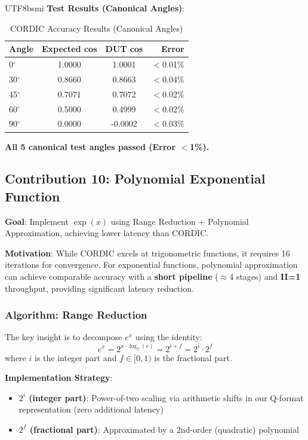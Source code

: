 \documentclass[journal,twoside]{IEEEtran}
\begin{document}
\begin{CJK}{UTF8}{bsmi}
\textbf{Test Results (Canonical Angles)}:
\begin{table}[htbp]
\centering
\caption{CORDIC Accuracy Results (Canonical Angles)}
\footnotesize
\begin{tabular}{@{}lccr@{}}
\toprule
\textbf{Angle} & \textbf{Expected cos} & \textbf{DUT cos} & \textbf{Error} \\
\midrule
0$^\circ$ & 1.0000 & 1.0001 & $<$0.01\% \\
30$^\circ$ & 0.8660 & 0.8663 & $<$0.04\% \\
45$^\circ$ & 0.7071 & 0.7072 & $<$0.02\% \\
60$^\circ$ & 0.5000 & 0.4999 & $<$0.02\% \\
90$^\circ$ & 0.0000 & -0.0002 & $<$0.03\% \\
\bottomrule
\end{tabular}
\end{table}

\textbf{All 5 canonical test angles passed (Error $<$1\%).}

\subsection{Contribution 10: Polynomial Exponential Function}

\textbf{Goal}: Implement $\exp(x)$ using Range Reduction + Polynomial Approximation, achieving lower latency than CORDIC.

\textbf{Motivation}: While CORDIC excels at trigonometric functions, it requires 16 iterations for convergence. For exponential functions, polynomial approximation can achieve comparable accuracy with a \textbf{short pipeline} ($\approx$4 stages) and \textbf{II=1} throughput, providing significant latency reduction.

\subsubsection{Algorithm: Range Reduction}
The key insight is to decompose $e^x$ using the identity:
\begin{equation}
e^x = 2^{x \cdot \log_2(e)} = 2^{i+f} = 2^i \cdot 2^f
\end{equation}
where $i$ is the integer part and $f \in [0,1)$ is the fractional part.

\textbf{Implementation Strategy}:
\begin{itemize}
    \item \textbf{$2^i$ (integer part)}: Power-of-two scaling via arithmetic shifts in our Q-format representation (zero additional latency)
    \item \textbf{$2^f$ (fractional part)}: Approximated by a 2nd-order (quadratic) polynomial
\end{itemize}


\end{CJK}
\end{document}
